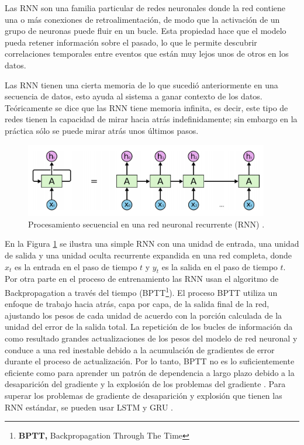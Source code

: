 \vspace{5mm} %

Las RNN son una familia particular de redes neuronales donde la red contiene una o más conexiones de retroalimentación, de modo que la activación de un grupo de neuronas puede fluir en un bucle. Esta propiedad hace que el modelo pueda retener informaci\'{o}n sobre el pasado, lo que le permite descubrir correlaciones temporales entre eventos que est\'{a}n muy lejos unos de otros en los datos.

\vspace{5mm} %

Las RNN tienen una cierta memoria de lo que sucedi\'{o} anteriormente en una secuencia de datos, esto ayuda al sistema a ganar contexto de los datos. Te\'{o}ricamente se dice que las RNN tiene memoria infinita, es decir, este tipo de redes tienen la capacidad de mirar hacia atr\'{a}s indefinidamente; sin embargo en la pr\'{a}ctica s\'{o}lo se puede mirar atr\'{a}s unos \'{u}ltimos pasos.

\begin{figure}[h!]
  \begin{center}	\includegraphics[width=0.95\textwidth, frame]{imagenes/Cap4/rnn}
  \caption{Procesamiento secuencial en una red neuronal recurrente (RNN) \protect\cite{Reference53}.}
  \label{fig:rnn}
  \end{center}
\end{figure}

En la Figura \ref{fig:rnn} se ilustra una simple RNN con una unidad de entrada, una unidad de salida y una unidad oculta recurrente expandida en una red completa, donde $x_{t}$ es la entrada en el paso de tiempo $t$ y $y_{t}$ es la salida en el paso de tiempo $t$. Por otra parte en el proceso de entrenamiento las RNN usan el algoritmo de Backpropagation a trav\'{e}s del tiempo (BPTT\footnote{\textbf{BPTT,} Backpropagation Through The Time}). El proceso BPTT utiliza un enfoque de trabajo hacia atrás, capa por capa, de la salida final de la red, ajustando los pesos de cada unidad de acuerdo con la porción calculada de la unidad del error de la salida total. La repetición de los bucles de información da como resultado grandes actualizaciones de los pesos del modelo de red neuronal y conduce a una red inestable debido a la acumulación de gradientes de error durante el proceso de actualización. Por lo tanto, BPTT no es lo suficientemente eficiente como para aprender un patrón de dependencia a largo plazo debido a la desaparición del gradiente y la explosión de los problemas del gradiente \cite{Reference50}. Para superar los problemas de gradiente de desaparición y explosión que tienen las RNN estándar, se pueden usar LSTM y GRU \cite{Reference51}.

